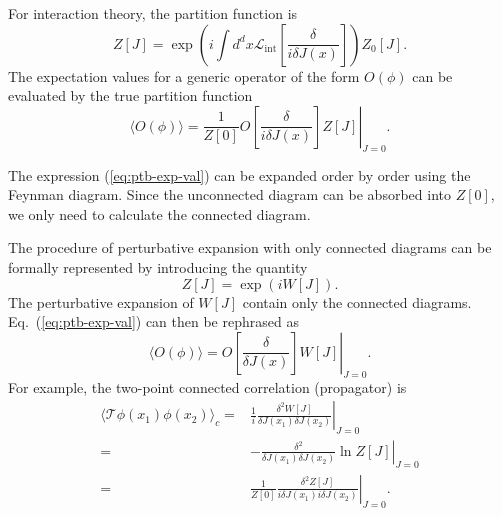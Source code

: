For interaction theory, the partition function is
\begin{equation}
	Z[J] = \exp\left(i\int d^dx \mathcal{L}_{\mathrm{int}}\left[\frac{\delta}{i\delta J(x)}\right]\right)Z_0[J].
\end{equation}
The expectation values for a generic operator of the form $O(\phi)$ can be evaluated by the true partition function
\begin{equation}
	\langle O(\phi)\rangle
	= \frac{1}{Z[0]} \left. O\left[\frac{\delta}{i\delta J(x)}\right] Z[J] \right|_{J=0}.
	\label{eq:ptb-exp-val}
\end{equation}

\begin{framedrmk}
The expression (\ref{eq:ptb-exp-val}) can be expanded order by order using the Feynman diagram. 
Since the unconnected diagram can be absorbed into $Z[0]$, we only need to calculate the connected diagram.

The procedure of perturbative expansion with only connected diagrams can be formally represented by introducing the quantity
\begin{equation}
	Z[J] = \exp\left(i W[J]\right).
\end{equation}
The perturbative expansion of $W[J]$ contain only the connected diagrams.
Eq.~(\ref{eq:ptb-exp-val}) can then be rephrased as
\begin{equation}
	\langle O(\phi)\rangle
	= \left. O\left[\frac{\delta}{\delta J(x)}\right] W[J] \right|_{J=0}.
\end{equation}
For example, the two-point connected correlation (propagator) is
\begin{equation}
\begin{aligned}
	\langle \mathcal{T}\phi(x_1) \phi(x_2)\rangle_c 
	=& \frac{1}{i}\left.\frac{\delta^2 W[J]}{\delta J(x_1)\delta J(x_2)}\right|_{J=0} \\
	=& -\left.\frac{\delta^2}{\delta J(x_1)\delta J(x_2)} \ln Z[J]\right|_{J=0} \\
	=& \frac{1}{Z[0]}\left.\frac{\delta^2 Z[J]}{i\delta J(x_1)i\delta J(x_2)}\right|_{J=0}.
\end{aligned}
\end{equation}
\end{framedrmk}





